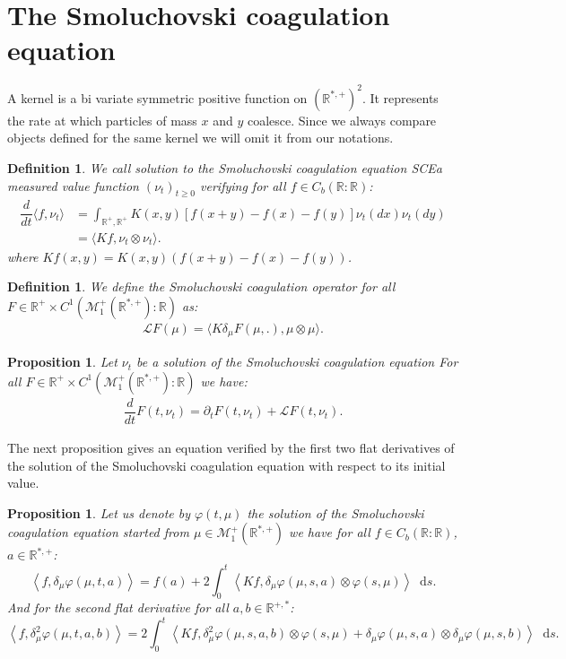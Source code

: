 \documentclass[11pt,a4paper]{article}
\newcommand{\RR}{\mathbb{R}}
\newcommand{\MC}{\mathcal{M}}
\newcommand{\LC}{\mathcal{L}}
\newcommand{\Proc}[1]{\left(#1\right)_{t\geq 0}}
\newcommand{\SCE}{{\emph{SCE}}}
\newcommand{\dd}{\mathop{}\!\mathrm{d}}
\newtheorem{proposition}[theorem]{Proposition}
\newtheorem{definition}[theorem]{Definition}
\begin{document}
\section{The Smoluchovski coagulation equation}
A kernel is a bi variate symmetric positive function on $(\RR^{*,+})^2$. It represents the rate at which particles of mass $x$ and $y$ coalesce. Since we always compare objects defined for the same kernel we will omit it from our notations.
\begin{definition}
    We call solution to the Smoluchovski coagulation equation \SCE a measured value function $\Proc{\nu_t}$ verifying for all $f \in C_b(\RR:\RR)$:
    \begin{align*}
        \dfrac{d}{dt}\langle f,\nu_t \rangle &= \int_{\RR^+, \RR^+} 
        K(x,y)\left[f(x+y) - f(x) - f(y)\right] \nu_t(dx)\nu_t(dy)\\
        &= \langle Kf , \nu_t \otimes \nu_t\rangle.
    \end{align*}
    where $Kf(x,y) = K(x,y)\left(f(x+y) - f(x) - f(y) \right)$.
\end{definition}
\begin{definition}
    We define the Smoluchovski coagulation operator for all $F \in \RR^+ \times C^1(\MC_1^+\left(\RR^{*,+} \right):\RR)$ as:
    \begin{align*}
        \LC F(\mu) = \langle K\delta_\mu F(\mu,.) , \mu\otimes \mu\rangle.
    \end{align*}
\end{definition}
\begin{proposition}
    Let $\nu_t$ be a solution of the Smoluchovski coagulation equation For all $F \in \RR^+ \times C^1(\MC_1^+\left(\RR^{*,+} \right):\RR)$ we have:
    \begin{align*}
        \dfrac{d}{dt} F(t, \nu_t) = \partial_t F(t, \nu_t) + \LC F(t,\nu_t).
    \end{align*}
\end{proposition}
The next proposition gives an equation verified by the first two flat derivatives of the solution of the Smoluchovski coagulation equation with respect to its initial value.
\begin{proposition}\label{prop:smol_derivative_equations}
    Let us denote by $\varphi(t,\mu)$ the solution of the Smoluchovski coagulation equation started from $\mu \in \MC_1^+\left(\RR^{*,+}\right)$ we have for all $f \in C_b(\RR:\RR)$, $a\in \RR^{*,+}$:
    \begin{equation}\label{eq:smol_first_derivative}
        \left\langle f, \delta_\mu \varphi(\mu,t,a)\right\rangle
        = f(a) + 2\int_0^t \left\langle Kf, \delta_\mu \varphi(\mu,s,a) \otimes \varphi(s,\mu)\right\rangle\dd s.
    \end{equation}
    And for the second flat derivative for all $a,b \in \RR^{+,*}$:
    \begin{equation}\label{eq:smol_first_derivative}
        \left\langle f, \delta^2_\mu \varphi(\mu,t,a,b)\right\rangle
        = 2\int_0^t \left\langle Kf, \delta^2_\mu \varphi(\mu,s,a,b) \otimes \varphi(s,\mu) + \delta_\mu \varphi(\mu,s,a)\otimes  \delta_\mu \varphi(\mu,s,b)\right\rangle \dd s.
    \end{equation}
\end{proposition}
\end{document}
